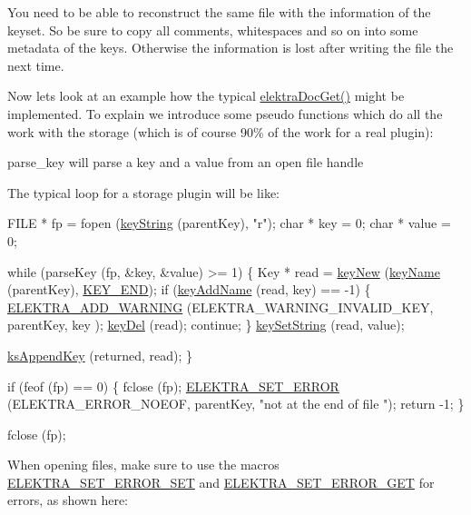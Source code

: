 You need to be able to reconstruct the same file with the information of the keyset. So be sure to copy all comments, whitespaces and so on into some metadata of the keys. Otherwise the information is lost after writing the file the next time.

Now lets look at an example how the typical \hyperlink{group__plugin_gacb69f3441c6d84241b4362f958fbe313}{elektra\+Doc\+Get()} might be implemented. To explain we introduce some pseudo functions which do all the work with the storage (which is of course 90\% of the work for a real plugin)\+:
\begin{DoxyItemize}
\item parse\+\_\+key will parse a key and a value from an open file handle
\end{DoxyItemize}

The typical loop for a storage plugin will be like\+:


\begin{DoxyCodeInclude}
        FILE * fp = fopen (\hyperlink{group__keyvalue_ga880936f2481d28e6e2acbe7486a21d05}{keyString} (parentKey), \textcolor{stringliteral}{"r"});
        \textcolor{keywordtype}{char} * key = 0;
        \textcolor{keywordtype}{char} * value = 0;

        \textcolor{keywordflow}{while} (parseKey (fp, &key, &value) >= 1)
        \{
                Key * read = \hyperlink{group__key_gad23c65b44bf48d773759e1f9a4d43b89}{keyNew} (\hyperlink{group__keyname_ga8e805c726a60da921d3736cda7813513}{keyName} (parentKey), \hyperlink{group__key_gga91fb3178848bd682000958089abbaf40aa8adb6fcb92dec58fb19410eacfdd403}{KEY\_END});
                \textcolor{keywordflow}{if} (\hyperlink{group__keyname_gaa70593a2c772c4b7bc33423b9b10a270}{keyAddName} (read, key) == -1)
                \{
                        \hyperlink{group__plugin_ga3da3bdb0f41710adda9eee3d7adac9ff}{ELEKTRA\_ADD\_WARNING} (ELEKTRA\_WARNING\_INVALID\_KEY, parentKey, key
      );
                        \hyperlink{group__key_ga3df95bbc2494e3e6703ece5639be5bb1}{keyDel} (read);
                        \textcolor{keywordflow}{continue};
                \}
                \hyperlink{group__keyvalue_ga622bde1eb0e0c4994728331326340ef2}{keySetString} (read, value);

                \hyperlink{group__keyset_gaa5a1d467a4d71041edce68ea7748ce45}{ksAppendKey} (returned, read);
        \}

        \textcolor{keywordflow}{if} (feof (fp) == 0)
        \{
                fclose (fp);
                \hyperlink{group__plugin_gaab1842b82272e6d4235b6a71587a64d9}{ELEKTRA\_SET\_ERROR} (ELEKTRA\_ERROR\_NOEOF, parentKey, \textcolor{stringliteral}{"not at the end of file
      "});
                \textcolor{keywordflow}{return} -1;
        \}

        fclose (fp);
\end{DoxyCodeInclude}
 When opening files, make sure to use the macros \hyperlink{group__plugin_gaf526686f01dbacd68671732aad4b5d76}{E\+L\+E\+K\+T\+R\+A\+\_\+\+S\+E\+T\+\_\+\+E\+R\+R\+O\+R\+\_\+\+S\+ET} and \hyperlink{group__plugin_ga2f5d331ed725c6af0c511a0aa8677daa}{E\+L\+E\+K\+T\+R\+A\+\_\+\+S\+E\+T\+\_\+\+E\+R\+R\+O\+R\+\_\+\+G\+ET} for errors, as shown here\+:


